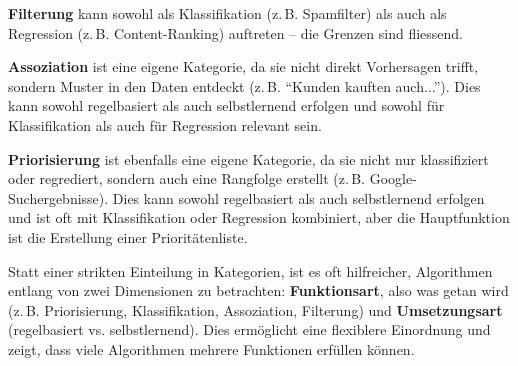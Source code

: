 \textbf{Filterung} kann sowohl als Klassifikation (z.\,B. Spamfilter) als auch als Regression (z.\,B. Content-Ranking) auftreten -- die Grenzen sind fliessend. 

\textbf{Assoziation} ist eine eigene Kategorie, da sie nicht direkt Vorhersagen trifft, sondern Muster in den Daten entdeckt (z.\,B. \enquote{Kunden kauften auch...}). Dies kann sowohl regelbasiert als auch selbstlernend erfolgen und sowohl für Klassifikation als auch für Regression relevant sein.

\textbf{Priorisierung} ist ebenfalls eine eigene Kategorie, da sie nicht nur klassifiziert oder regrediert, sondern auch eine Rangfolge erstellt (z.\,B. Google-Suchergebnisse). Dies kann sowohl regelbasiert als auch selbstlernend erfolgen und ist oft mit Klassifikation oder Regression kombiniert, aber die Hauptfunktion ist die Erstellung einer Prioritätenliste.

Statt einer strikten Einteilung in Kategorien, ist es oft hilfreicher, Algorithmen entlang von zwei Dimensionen zu betrachten: \textbf{Funktionsart}, also was getan wird (z.\,B. Priorisierung, Klassifikation, Assoziation, Filterung) und \textbf{Umsetzungsart} (regelbasiert vs. selbstlernend). Dies ermöglicht eine flexiblere Einordnung und zeigt, dass viele Algorithmen mehrere Funktionen erfüllen können. 

